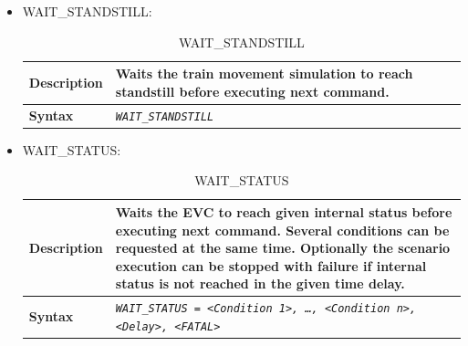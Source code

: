 \documentclass{template/openetcs}
\begin{document}
\begin{itemize}
\begin{longtable}{|l|l|}
			\hline\hline
			
		\end{longtable}
		
	\item WAIT\_STANDSTILL:				
		
		\begin{longtable}{|l|l|}
			\caption{WAIT\_STANDSTILL}\\ 
			\hline
			
				\begin{minipage}[t]{0.22\linewidth} \textbf{Description} \end{minipage} 
			&	\begin{minipage}[t]{0.78\linewidth} Waits the train movement simulation to reach standstill before executing next command. \end{minipage} \\
			
			\hline
						
				\begin{minipage}[t]{0.22\linewidth} \textbf{Syntax}	\end{minipage}
			&	\begin{minipage}[t]{0.78\linewidth} \emph{\texttt{WAIT\_STANDSTILL}} \end{minipage} \\
			
			\hline\hline
			
		\end{longtable}
		
	\item WAIT\_STATUS:
		\begin{longtable}{|l|l|l|}
			\caption{WAIT\_STATUS}\\ 
			\hline

				\begin{minipage}[t]{0.22\linewidth} \textbf{Description} \end{minipage} 
			&	\multicolumn{2}{l|}{ \begin{minipage}[t]{0.78\linewidth} Waits the EVC to reach given internal status before executing next command. Several conditions can be requested at the same time. Optionally the scenario execution can be stopped with failure if internal status is not reached in the given time delay. \end{minipage} } \\
			
			\hline
						
				\begin{minipage}[t]{0.22\linewidth} \textbf{Syntax}	\end{minipage}
			&	\multicolumn{2}{l|}{ \begin{minipage}[t]{0.78\linewidth} \emph{\texttt{WAIT\_STATUS = <Condition 1>, …, <Condition n>, <Delay>, <FATAL>}} \end{minipage} } \\
			

\end{longtable}
\end{itemize}
\end{document}
